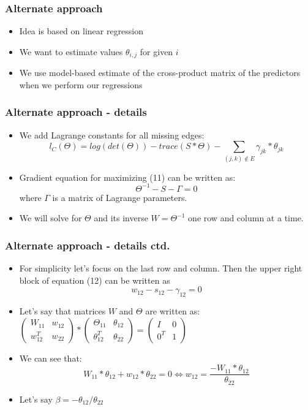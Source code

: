 \documentclass{beamer}
\begin{document}
\begin{frame}
\frametitle{Alternate approach}
\begin{itemize}
\item Idea is based on linear regression
\item We want to estimate values $\theta_{i,j}$ for given $i$
\item We use model-based estimate of the cross-product matrix of the predictors when we perform our regressions
\end{itemize}
\end{frame}

\begin{frame}
\frametitle{Alternate approach - details}
\begin{itemize}
\item We add Lagrange constants for all missing edges:
\begin{equation}
l_C(\Theta)=log(det(\Theta))-trace(S*\Theta)-\sum_{(j, k)\notin E}{\gamma_{jk}*\theta_{jk}}
\end{equation}
\item Gradient equation for maximizing (11) can be written as:
\begin{equation}
\Theta^{-1} - S - \Gamma = 0
\end{equation}
where $\Gamma$ is a matrix of Lagrange parameters.
\item We will solve for $\Theta$ and its inverse $W = \Theta^{-1}$ one row and column at a time.
\end{itemize}
\end{frame}
\begin{frame}
\frametitle{Alternate approach - details ctd.}
\begin{itemize}
\item For simplicity let’s focus on the
last row and column. Then the upper right block of equation (12) can be written as
\begin{equation}
w_{12}-s_{12}-\gamma_{12}=0
\end{equation}
\item Let's say that matrices $W$ and $\Theta$ are written as:
$\begin{pmatrix}
W_{11} & w_{12}\\
w_{12}^T & w_{22}
\end{pmatrix} * \begin{pmatrix}
\Theta_{11} & \theta_{12}\\
\theta_{12}^T & \theta_{22} 
\end{pmatrix} = \begin{pmatrix}
I & 0\\
0^T & 1 
\end{pmatrix}$ 
\item We can see that:
\begin{equation}
W_{11} * \theta_{12} + w_{12}*\theta_{22}=0 \iff w_{12}=\frac{-W_{11}*\theta_{12}}{\theta_{22}}
\end{equation}
\item Let's say $\beta = −\theta_{12} / \theta_{22}$
\end{itemize}
\end{frame}
\end{document}
